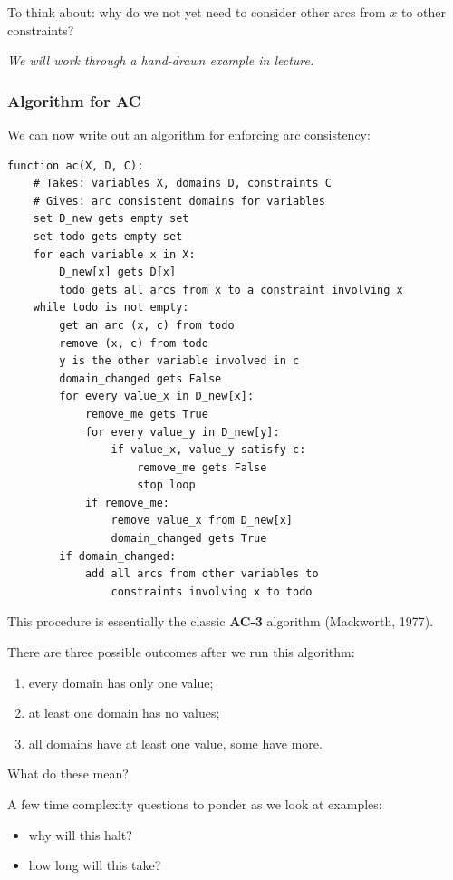 \documentclass[11pt]{article}
\begin{document}
To think about: why do we not yet need to consider other arcs from $x$ to other constraints?

\emph{We will work through a hand-drawn example in lecture.}

\subsubsection{Algorithm for AC}

We can now write out an algorithm for enforcing arc consistency:

\begin{verbatim}
function ac(X, D, C):
    # Takes: variables X, domains D, constraints C
    # Gives: arc consistent domains for variables
    set D_new gets empty set
    set todo gets empty set
    for each variable x in X:
        D_new[x] gets D[x]
        todo gets all arcs from x to a constraint involving x
    while todo is not empty:
        get an arc (x, c) from todo
        remove (x, c) from todo
        y is the other variable involved in c
        domain_changed gets False
        for every value_x in D_new[x]:
            remove_me gets True
            for every value_y in D_new[y]:
                if value_x, value_y satisfy c:
                    remove_me gets False
                    stop loop
            if remove_me:
                remove value_x from D_new[x]
                domain_changed gets True
        if domain_changed:
            add all arcs from other variables to
                constraints involving x to todo
\end{verbatim}

This procedure is essentially the classic \textbf{AC-3} algorithm (Mackworth, 1977).

There are three possible outcomes after we run this algorithm:
\begin{enumerate}
    \item every domain has only one value;
    \item at least one domain has no values;
    \item all domains have at least one value, some have more.
\end{enumerate}

What do these mean?

A few time complexity questions to ponder as we look at examples:
\begin{itemize}
    \item why will this halt?
    \item how long will this take?
\end{itemize}
\end{document}
